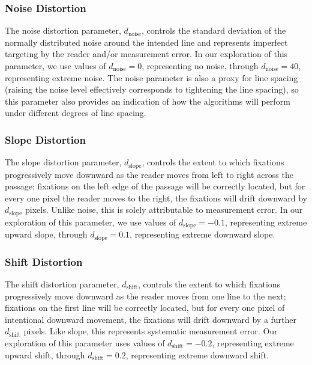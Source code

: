 \documentclass[doc,biblatex]{apa7}
\begin{document}
\subsubsection{Noise Distortion}

The noise distortion parameter, $d_\mathrm{noise}$, controls the standard deviation of the normally distributed noise around the intended line and represents imperfect targeting by the reader and/or measurement error. In our exploration of this parameter, we use values of $d_\mathrm{noise} = 0$, representing no noise, through $d_\mathrm{noise} = 40$, representing extreme noise. The noise parameter is also a proxy for line spacing (raising the noise level effectively corresponds to tightening the line spacing), so this parameter also provides an indication of how the algorithms will perform under different degrees of line spacing.

\subsubsection{Slope Distortion}

The slope distortion parameter, $d_\mathrm{slope}$, controls the extent to which fixations progressively move downward as the reader moves from left to right across the passage; fixations on the left edge of the passage will be correctly located, but for every one pixel the reader moves to the right, the fixations will drift downward by $d_\mathrm{slope}$ pixels. Unlike noise, this is solely attributable to measurement error. In our exploration of this parameter, we use values of $d_\mathrm{slope} = -0.1$, representing extreme upward slope, through $d_\mathrm{slope} = 0.1$, representing extreme downward slope.

\subsubsection{Shift Distortion}

The shift distortion parameter, $d_\mathrm{shift}$, controls the extent to which fixations progressively move downward as the reader moves from one line to the next; fixations on the first line will be correctly located, but for every one pixel of intentional downward movement, the fixations will drift downward by a further $d_\mathrm{shift}$ pixels. Like slope, this represents systematic measurement error. Our exploration of this parameter uses values of $d_\mathrm{shift} = -0.2$, representing extreme upward shift, through $d_\mathrm{shift} = 0.2$, representing extreme downward shift.
\end{document}
